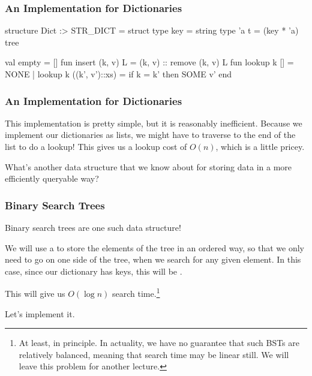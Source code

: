 \documentclass[aspectratio=169, handout]{beamer}
\begin{document}
\begin{frame}[fragile]
  \frametitle{An Implementation for Dictionaries}

  \begin{codeblock}
    structure Dict :> STR_DICT =
      struct
        type key = string
        type 'a t = (key * 'a) tree

        val empty = []
        fun insert (k, v) L = (k, v) :: remove (k, v) L
        fun lookup k [] = NONE
          | lookup k ((k', v')::xs) =
              if k = k' then SOME v'
      end
  \end{codeblock}
\end{frame}

\begin{frame}[fragile]
  \frametitle{An Implementation for Dictionaries}

  This implementation is pretty simple, but it is reasonably
  inefficient. Because we implement our dictionaries as lists,
  we might have to traverse to the end of the list to do a
  lookup! This gives us a lookup cost of $O(n)$, which is a
  little pricey.

  \pause
  \vspace{\fill}

  What's another data structure that we know about for storing
  data in a more efficiently queryable way?
\end{frame}

\begin{frame}[fragile]
  \frametitle{Binary Search Trees}

  Binary search trees are one such data structure!

  \pause
  \vspace{\fill}

  We will use a  to store the elements
  of the tree in an ordered way, so that we only need to go on
  one side of the tree, when we search for any given element. In
  this case, since our dictionary has  keys, this
  will be .

  \pause
  \vspace{\fill}

  This will give us $O(\log n)$ search time.\footnote{
    At least, in principle. In actuality, we have no guarantee
    that such BSTs are relatively balanced, meaning that search time may be
    linear still. We will leave this problem for another lecture.
  }

  \pause
  \vspace{\fill}

  Let's implement it.
\end{frame}
\end{document}
